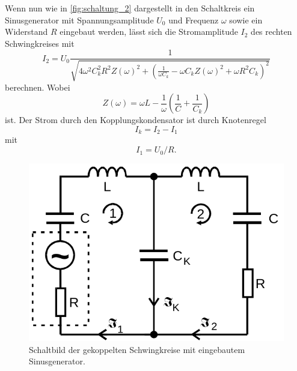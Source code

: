 Wenn nun wie in \autoref{fig:schaltung_2} dargestellt in den Schaltkreis ein Sinusgenerator mit Spannungsamplitude $U_0$ und Frequenz $\omega$ sowie ein Widerstand $R$ eingebaut werden, lässt sich die Stromamplitude $I_2$ des rechten Schwingkreises mit 
\begin{equation}
    \label{eq:stromamplitude}
    I_2 = U_0 \frac{1}{\sqrt{4 \omega^2 C_k^2 R^2 Z(\omega)^2 + \left( \frac{1}{\omega C_k} - \omega C_k Z(\omega)^2 + \omega R^2 C_k \right)^2 }}
\end{equation}
berechnen. Wobei 
\begin{equation}
    Z(\omega) = \omega L - \frac{1}{\omega} \left( \frac{1}{C} + \frac{1}{C_k} \right)
\end{equation}
ist. \cite{V355}
Der Strom durch den Kopplungskondensator ist durch Knotenregel
\begin{equation}
    I_k = I_2 - I_1
\end{equation}
mit 
\begin{equation}
    I_1 = U_0 / R.
\end{equation}
\begin{figure}
    \centering
    \includegraphics[width=\textwidth/3]{images/schaltung_2.png}
    \caption{Schaltbild der gekoppelten Schwingkreise mit eingebautem Sinusgenerator. \cite{V355}}
    \label{fig:schaltung_2}
\end{figure}

